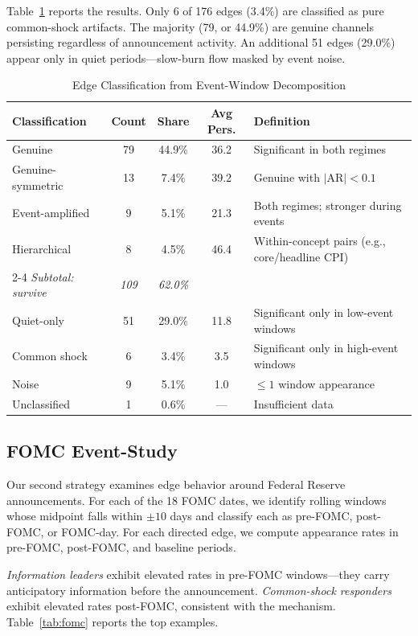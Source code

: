 \documentclass[12pt,letterpaper]{article}
\begin{document}
Table~\ref{tab:classification} reports the results. Only 6 of 176 edges (3.4\%) are classified as pure common-shock artifacts. The majority (79, or 44.9\%) are genuine channels persisting regardless of announcement activity. An additional 51 edges (29.0\%) appear only in quiet periods---slow-burn flow masked by event noise.

\begin{table}[H]
\centering
\caption{Edge Classification from Event-Window Decomposition}\label{tab:classification}
\begin{tabular}{lcccl}
\toprule
Classification & Count & Share & Avg Pers. & Definition \\
\midrule
Genuine & 79 & 44.9\% & 36.2 & Significant in both regimes \\
Genuine-symmetric & 13 & 7.4\% & 39.2 & Genuine with $|\text{AR}| < 0.1$ \\
Event-amplified & 9 & 5.1\% & 21.3 & Both regimes; stronger during events \\
Hierarchical & 8 & 4.5\% & 46.4 & Within-concept pairs (e.g., core/headline CPI) \\
\cmidrule{2-4}
\textit{Subtotal: survive} & \textit{109} & \textit{62.0\%} & & \\
\midrule
Quiet-only & 51 & 29.0\% & 11.8 & Significant only in low-event windows \\
Common shock & 6 & 3.4\% & 3.5 & Significant only in high-event windows \\
Noise & 9 & 5.1\% & 1.0 & $\leq 1$ window appearance \\
Unclassified & 1 & 0.6\% & --- & Insufficient data \\
\bottomrule
\end{tabular}
\end{table}

\subsection{FOMC Event-Study}

Our second strategy examines edge behavior around Federal Reserve announcements. For each of the 18 FOMC dates, we identify rolling windows whose midpoint falls within $\pm 10$ days and classify each as pre-FOMC, post-FOMC, or FOMC-day. For each directed edge, we compute appearance rates in pre-FOMC, post-FOMC, and baseline periods.

\textit{Information leaders} exhibit elevated rates in pre-FOMC windows---they carry anticipatory information before the announcement. \textit{Common-shock responders} exhibit elevated rates post-FOMC, consistent with the \citet{ottaviani2015price} mechanism. Table~\ref{tab:fomc} reports the top examples.
\end{document}
